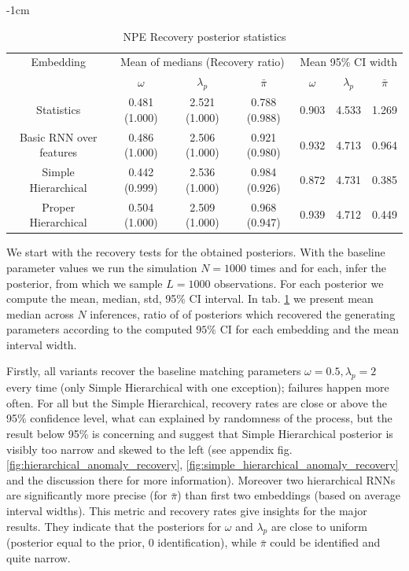 \documentclass[12pt]{article}
\begin{document}
\begin{table}[ht]
    \centering
    \addtolength{\leftskip} {-1cm} %
    \addtolength{\rightskip}{-1cm}
    \begin{tabular}{|c|c c c|c c c |}
        \hline
         Embedding & 
         \multicolumn{3}{|c|}{Mean of medians (Recovery ratio)} & \multicolumn{3}{|c|}{Mean 95\% CI width} \\
         & $\omega$ & $\lambda_p$ & $\bar{\pi}$ &  $\omega$ & $\lambda_p$ & $\bar{\pi}$ \\
         \hline
         Statistics & 0.481 (1.000) & 2.521 (1.000) & 0.788 (0.988) &  0.903 & 4.533 & 1.269 \\
         Basic RNN over features &0.486 (1.000) & 2.506 (1.000) & 0.921 (0.980) &   0.932 & 4.713 & 0.964 \\
         Simple Hierarchical &0.442 (0.999) & 2.536 (1.000) & 0.984 (0.926)&  0.872 & 4.731 & 0.385 \\
         Proper Hierarchical &0.504 (1.000) & 2.509 (1.000) & 0.968 (0.947) &  0.939 & 4.712 & 0.449\\
         \hline \hline
    \end{tabular}
    \caption{NPE Recovery posterior statistics}
    \label{tab:recovery_npes}
\end{table}

We start with the recovery tests for the obtained posteriors. With the baseline parameter values we run the simulation $N = 1000$ times and for each, infer the posterior, from which we sample $L = 1000$ observations. For each posterior we compute the mean, median, std, 95\% CI interval. In tab. \ref{tab:recovery_npes} we present mean median across $N$ inferences, ratio of of posteriors which recovered the generating parameters according to the computed $95\%$ CI for each embedding and the mean interval width. 

Firstly, all variants recover the baseline matching parameters $\omega = 0.5, \lambda_p = 2$ every time (only Simple Hierarchical with one exception); failures happen more often. For all but the Simple Hierarchical, recovery rates are close or above the 95\% confidence level, what can explained by randomness of the process, but the result below 95\% is concerning and suggest that Simple Hierarchical posterior is visibly too narrow and skewed to the left (see appendix fig. \ref{fig:hierarchical_anomaly_recovery}, \ref{fig:simple_hierarchical_anomaly_recovery} and the discussion there for more information). Moreover two hierarchical RNNs are significantly more precise (for $\bar{\pi}$) than first two embeddings (based on average interval widths). This metric and recovery rates give insights for the major results. They indicate that the posteriors for $\omega$ and $\lambda_p$ are close to uniform (posterior equal to the prior, 0 identification), while $\bar{\pi}$ could be identified and quite narrow. 
\end{document}
